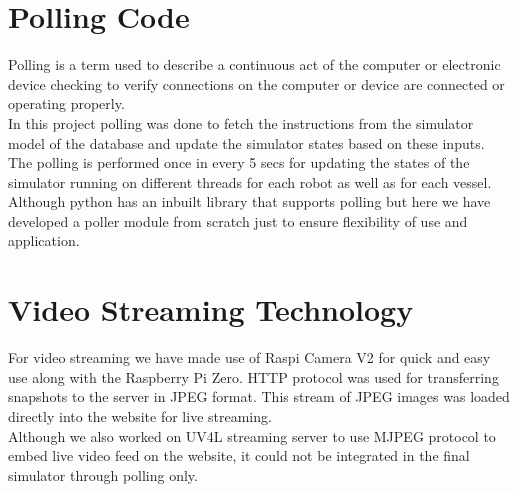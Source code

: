 \section{Polling Code}
{\normalsize Polling is a term used to describe a continuous act of the computer or electronic device checking to verify connections on the computer or device are connected or operating properly.\\[0.1in]
In this project polling was done to fetch the instructions from the simulator model of the database and update the simulator states based on these inputs. The polling is performed once in every 5 secs for updating the states of the simulator running on different threads for each robot as well as for each vessel. \\[0.1in]
Although python has an inbuilt library that supports polling but here we have developed a poller module from scratch just to ensure flexibility of use and application. 
}
\section{Video Streaming Technology}
{\normalsize For video streaming we have made use of Raspi Camera V2 for quick and easy use along with the Raspberry Pi Zero. HTTP protocol was used for transferring snapshots to the server in JPEG format. This stream of JPEG images was loaded directly into the website for live streaming. \\[0.1in]
Although we also worked on UV4L streaming server to use MJPEG protocol to embed live video feed on the website, it could not be integrated in the final simulator through polling only. 
}
